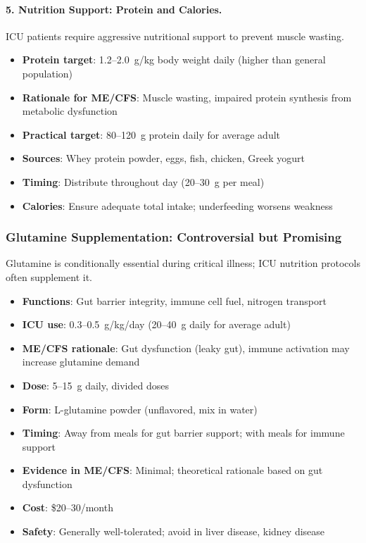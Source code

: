 \paragraph{5. Nutrition Support: Protein and Calories.}
ICU patients require aggressive nutritional support to prevent muscle wasting.

\begin{itemize}
    \item \textbf{Protein target}: 1.2--2.0~g/kg body weight daily (higher than general population)
    \item \textbf{Rationale for ME/CFS}: Muscle wasting, impaired protein synthesis from metabolic dysfunction
    \item \textbf{Practical target}: 80--120~g protein daily for average adult
    \item \textbf{Sources}: Whey protein powder, eggs, fish, chicken, Greek yogurt
    \item \textbf{Timing}: Distribute throughout day (20--30~g per meal)
    \item \textbf{Calories}: Ensure adequate total intake; underfeeding worsens weakness
\end{itemize}

\subsubsection{Glutamine Supplementation: Controversial but Promising}

Glutamine is conditionally essential during critical illness; ICU nutrition protocols often supplement it.

\begin{itemize}
    \item \textbf{Functions}: Gut barrier integrity, immune cell fuel, nitrogen transport
    \item \textbf{ICU use}: 0.3--0.5~g/kg/day (20--40~g daily for average adult)
    \item \textbf{ME/CFS rationale}: Gut dysfunction (leaky gut), immune activation may increase glutamine demand
    \item \textbf{Dose}: 5--15~g daily, divided doses
    \item \textbf{Form}: L-glutamine powder (unflavored, mix in water)
    \item \textbf{Timing}: Away from meals for gut barrier support; with meals for immune support
    \item \textbf{Evidence in ME/CFS}: Minimal; theoretical rationale based on gut dysfunction
    \item \textbf{Cost}: \$20--30/month
    \item \textbf{Safety}: Generally well-tolerated; avoid in liver disease, kidney disease
\end{itemize}

